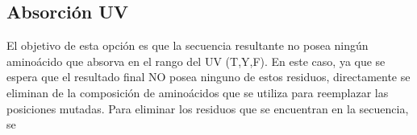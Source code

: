 \subsection{Absorción UV}

El objetivo de esta opción es que la secuencia resultante no posea ningún aminoácido que absorva en el rango del UV (T,Y,F).
En este caso, ya que se espera que el resultado final NO posea ninguno de estos residuos, directamente se eliminan de la composición de aminoácidos que se utiliza para reemplazar las posiciones mutadas. 
Para eliminar los residuos que se encuentran en la secuencia, se 
